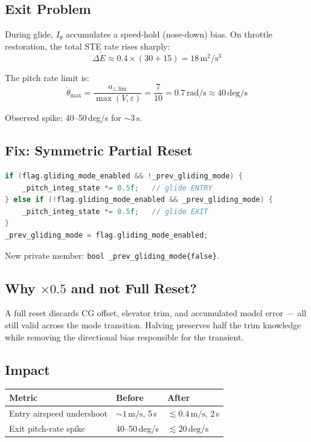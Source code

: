 \documentclass[12pt,a4paper]{article}
\begin{document}
\subsection{Exit Problem}

During glide, $I_\theta$ accumulates a speed-hold (nose-down) bias.
On throttle restoration, the total STE rate rises sharply:
\begin{equation}
  \Delta\dot{E} \approx 0.4 \times (30 + 15) = 18\,\text{m}^2/\text{s}^3
\end{equation}

The pitch rate limit is:
\begin{equation}
  \dot{\theta}_{\max} = \frac{a_{z,\text{lim}}}{\max(V,\varepsilon)}
  = \frac{7}{10} = 0.7\,\text{rad/s} \approx 40\,\text{deg/s}
\end{equation}

Observed spike: 40--50\,deg/s for $\sim 3\,\text{s}$.

\subsection{Fix: Symmetric Partial Reset}

\begin{lstlisting}[language=C++]
if (flag.gliding_mode_enabled && !_prev_gliding_mode) {
    _pitch_integ_state *= 0.5f;   // glide ENTRY
} else if (!flag.gliding_mode_enabled && _prev_gliding_mode) {
    _pitch_integ_state *= 0.5f;   // glide EXIT
}
_prev_gliding_mode = flag.gliding_mode_enabled;
\end{lstlisting}

New private member: \texttt{bool \_prev\_gliding\_mode\{false\}}.

\subsection{Why $\times 0.5$ and not Full Reset?}

A full reset discards CG offset, elevator trim, and accumulated model
error --- all still valid across the mode transition.
Halving preserves half the trim knowledge while removing the directional
bias responsible for the transient.

\subsection{Impact}

\begin{center}
\begin{tabular}{lll}
\toprule
Metric & Before & After \\
\midrule
Entry airspeed undershoot & $\sim 1\,\text{m/s}$, 5\,s & $\lesssim 0.4\,\text{m/s}$, 2\,s \\
Exit pitch-rate spike & 40--50\,deg/s & $\lesssim 20\,\text{deg/s}$ \\
\bottomrule
\end{tabular}
\end{center}
\end{document}

